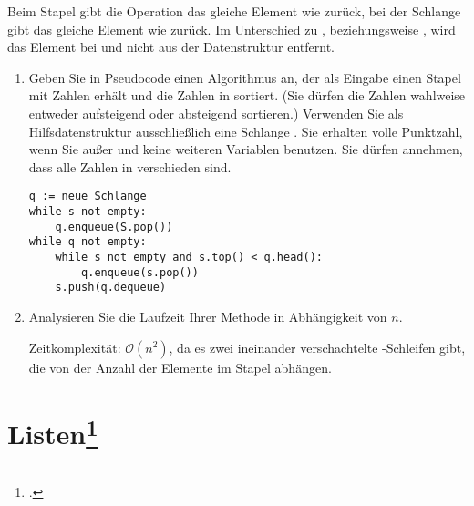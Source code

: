 \documentclass{lehramt-informatik}
\begin{document}
\noindent
Beim Stapel gibt die Operation  das gleiche Element wie
 zurück, bei der Schlange gibt  das gleiche
Element wie  zurück. Im Unterschied zu ,
beziehungsweise , wird das Element bei  und
 nicht aus der Datenstruktur entfernt.

\begin{enumerate}

%

\item Geben Sie in Pseudocode einen Algorithmus 
an, der als Eingabe einen Stapel  mit  Zahlen erhält und
die Zahlen in  sortiert. (Sie dürfen die Zahlen wahlweise
entweder aufsteigend oder absteigend sortieren.) Verwenden Sie als
Hilfsdatenstruktur ausschließlich eine Schlange . Sie erhalten
volle Punktzahl, wenn Sie außer  und  keine weiteren
Variablen benutzen. Sie dürfen annehmen, dass alle Zahlen in 
verschieden sind.

\begin{antwort}
\begin{verbatim}
q := neue Schlange
while s not empty:
    q.enqueue(S.pop())
while q not empty:
    while s not empty and s.top() < q.head():
        q.enqueue(s.pop())
    s.push(q.dequeue)
\end{verbatim}


\end{antwort}

%

\item Analysieren Sie die Laufzeit Ihrer Methode in Abhängigkeit von $n$.

\begin{antwort}
Zeitkomplexität: $\mathcal{O}(n^2)$, da es zwei ineinander
verschachtelte -Schleifen gibt, die von der Anzahl der
Elemente im Stapel abhängen.
\end{antwort}
\end{enumerate}

%

\section{Listen\footcite[Aufgabe 3]{aud:e-klausur}}
\end{document}
